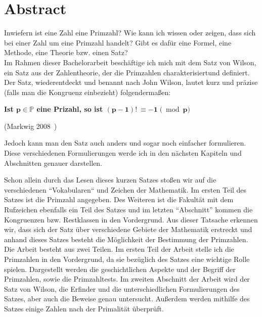 %
%

\chapter{Abstract}

Inwiefern ist eine Zahl eine Primzahl? Wie kann ich wissen oder zeigen,
dass sich bei einer Zahl um eine Primzahl handelt? Gibt es dafür eine
Formel, eine Methode, eine Theorie bzw. einen Satz?\\

Im Rahmen dieser Bachelorarbeit beschäftige ich mich mit dem Satz von
Wilson, ein Satz aus der Zahlentheorie, der die Primzahlen
charakterisiertund definiert. Der Satz, wiederentdeckt und benannt nach
John Wilson, lautet kurz und präzise (falls man die Kongruenz einbezieht)
folgendermaßen:

\begin{center}
    \textbf{Ist $\bm{ p \in} \mathbb{P}$ eine Prizahl, so ist $\bm{ (p-1)! \:\equiv -1} \;\bm ( \bmod \bm{p)}$}
    
    (Markwig 2008~\cite{markwig})
\end{center}

Jedoch kann man den Satz auch anders und sogar noch einfacher formulieren.
Diese verschiedenen Formulierungen werde ich in den nächsten Kapiteln und
Abschnitten genauer darstellen.

Schon allein durch das Lesen dieses kurzen Satzes stoßen wir auf die
verschiedenen ``Vokabularen`` und Zeichen der Mathematik. Im ersten Teil
des Satzes ist die Primzahl angegeben. Des Weiteren ist die Fakultät mit
dem Rufzeichen ebenfalls ein Teil des Satzes und im letzten ``Abschnitt''
kommen die Kongruenzen bzw. Restklassen in den Vordergrund. Aus dieser
Tatsache erkennen wir, dass sich der Satz über verschiedene Gebiete der
Mathematik erstreckt und anhand dieses Satzes besteht die Möglichkeit
der Bestimmung der Primzahlen.\\

Die Arbeit besteht aus zwei Teilen. Im ersten Teil der Arbeit stelle ich
die Primzahlen in den Vordergrund, da sie bezüglich des Satzes eine
wichtige Rolle spielen. Dargestellt werden die geschichtlichen Aspekte
und der Begriff der Primzahlen, sowie die Primzahltests.
Im zweiten Abschnitt der Arbeit wird der Satz von Wilson, die Erfinder
und die unterschiedlichen Formulierungen des Satzes, aber auch die
Beweise genau untersucht. Außerdem werden mithilfe des Satzes einige
Zahlen nach der Primalität überprüft.
\newpage
